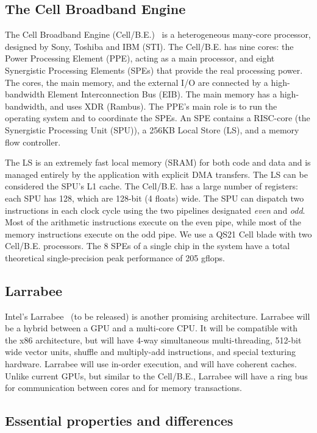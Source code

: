\documentclass{article}
\begin{document}
\subsection{The Cell Broadband Engine}

The Cell Broadband Engine (\mbox{Cell/B.E.})~\cite{cell} is a
heterogeneous many-core processor, designed by Sony, Toshiba and IBM
(STI).  The \mbox{Cell/B.E.} has nine cores: the Power Processing
Element (PPE), acting as a main processor, and eight Synergistic
Processing Elements (SPEs) that provide the real processing power.
The cores, the main memory, and the external I/O are connected by a
high-bandwidth Element Interconnection Bus (EIB).  The main memory has
a high-bandwidth, and uses XDR (Rambus).  The PPE's main role is to
run the operating system and to coordinate the SPEs.  An SPE contains
a RISC-core (the Synergistic Processing Unit (SPU)), a 256KB Local
Store (LS), and a memory flow controller.

The LS is an extremely fast local memory (SRAM) for both code and data
and is managed entirely by the application with explicit DMA
transfers.  The LS can be considered the SPU's L1 cache.  The
\mbox{Cell/B.E.} has a large number of registers: each SPU has 128,
which are 128-bit (4 floats) wide.  The SPU can dispatch two
instructions in each clock cycle using the two pipelines designated
\emph{even} and \emph{odd}. Most of the arithmetic instructions
execute on the even pipe, while most of the memory instructions
execute on the odd pipe.  We use a QS21 Cell blade with two
\mbox{Cell/B.E.} processors.  The 8 SPEs of a single chip in the
system have a total theoretical single-precision peak performance of
205 gflops.

\subsection{Larrabee}

Intel's Larrabee~\cite{larrabee} (to be released) is another promising
architecture.  Larrabee will be a hybrid between a GPU and a
multi-core CPU.  It will be compatible with the x86 architecture, but
will have 4-way simultaneous multi-threading, 512-bit wide vector
units, shuffle and multiply-add instructions, and special texturing
hardware. Larrabee will use in-order execution, and will have coherent
caches.  Unlike current GPUs, but similar to the \mbox{Cell/B.E.},
Larrabee will have a ring bus for communication between cores and for 
memory transactions.

\subsection{Essential properties and differences}
\end{document}
